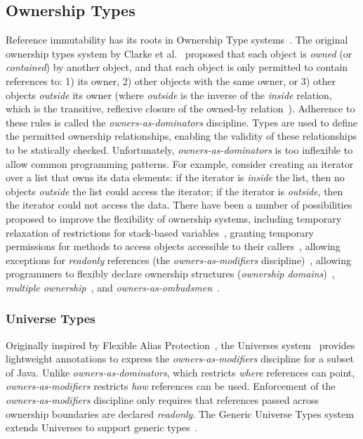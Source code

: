 \documentclass[letterpaper,11pt]{article}
\theoremstyle{definition}
\theoremstyle{remark}
\begin{document}
\subsection{Ownership Types}

Reference immutability has its roots in Ownership Type systems~\cite{ownership-types}.
The original ownership types system by Clarke et al.~\cite{ownership-types-1998}
proposed that each object is \emph{owned} (or \emph{contained}) by another object, and that
each object is only permitted to contain references to: 1) its owner,
2) other objects with the same owner, or 3) other objects \emph{outside} its owner
(where \emph{outside} is the inverse of the \emph{inside} relation, which is the
transitive, reflexive closure of the owned-by relation~\cite{ownership-types}).
Adherence to these rules is called the \emph{owners-as-dominators} discipline.
Types are used to define the permitted ownership relationships, enabling the validity
of these relationships to be statically checked.
Unfortunately, \emph{owners-as-dominators} is too inflexible to allow common programming patterns.
For example, consider creating an iterator over a list that owns its data elements:
if the iterator is \emph{inside} the list, then no objects \emph{outside} the list could
access the iterator; if the iterator is \emph{outside}, then the iterator could not
access the data.
There have been a number of possibilities proposed to improve the flexibility of
ownership systems, including temporary relaxation of restrictions for stack-based
variables~\cite{ownership-disjoint}, granting temporary permissions for methods to
access objects accessible to their callers~\cite{jot2000,external-uniqueness},
allowing exceptions for \emph{readonly} references (the \emph{owners-as-modifiers} discipline)~\cite{universes},
allowing programmers to flexibly declare ownership structures (\emph{ownership domains})~\cite{ownership-domains},
\emph{multiple ownership}~\cite{multiple-ownership}, and \emph{owners-as-ombudsmen}~\cite{owners-as-ombudsmen}.

\subsubsection{Universe Types}
\label{universe-types}

Originally inspired by Flexible Alias Protection~\cite{flexible-alias},
the Universes system~\cite{universes} provides lightweight annotations to express
the \emph{owners-as-modifiers} discipline for a subset of Java.
Unlike \emph{owners-as-dominators}, which restricts \emph{where} references
can point, \emph{owners-as-modifiers} restricts \emph{how} references can be used.
Enforcement of the \emph{owners-as-modifiers} discipline only requires that references
passed across ownership boundaries are declared \emph{readonly}.
The Generic Universe Types system extends Universes to support generic types~\cite{generic-universe-types}.
\end{document}
